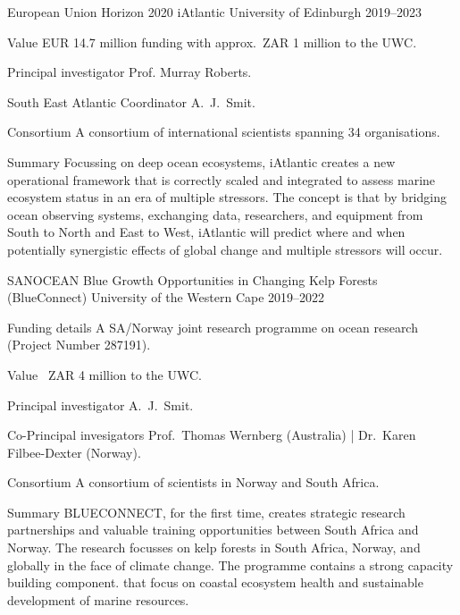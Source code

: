 \begin{cventries}

\cventry
{European Union Horizon 2020} %
{iAtlantic} %
{University of Edinburgh} %
{2019--2023} %
{ %
\begin{cvdescription}
    \item[Value] {EUR 14.7 million funding with approx.~ZAR 1 million to the UWC.}
    \item[Principal investigator] Prof. Murray Roberts.
    \item[South East Atlantic Coordinator] A.~J.~Smit.
    \item[Consortium] A consortium of international scientists spanning 34 organisations.
    \item[Summary] {
        Focussing on deep ocean ecosystems, iAtlantic creates a new operational framework that is correctly scaled and integrated to assess marine ecosystem status in an era of multiple stressors. The concept is that by bridging ocean observing systems, exchanging data, researchers, and equipment from South to North and East to West, iAtlantic will predict where and when potentially synergistic effects of global change and multiple stressors will occur.}
\end{cvdescription}
}


\cventry
{SANOCEAN} %
{Blue Growth Opportunities in Changing Kelp Forests (BlueConnect)} %
{University of the Western Cape} %
{2019--2022} %
{ %
\begin{cvdescription}
    \item[Funding details] A SA/Norway joint research programme on ocean research (Project Number 287191).
    \item[Value] {~ZAR 4 million to the UWC.}
    \item[Principal investigator] A.~J.~Smit.
    \item[Co-Principal invesigators] Prof.~Thomas Wernberg (Australia) | Dr.~Karen Filbee-Dexter (Norway).
    \item[Consortium] A consortium of scientists in Norway and South Africa.
    \item[Summary] {
        BLUECONNECT, for the first time, creates strategic research partnerships and valuable training opportunities between South Africa and Norway. The research focusses on kelp forests in South Africa, Norway, and globally in the face of climate change. The programme contains a strong capacity building component.
that focus on coastal ecosystem health and sustainable development of marine resources.}
\end{cvdescription}
}


\end{cventries}

